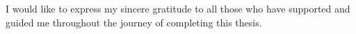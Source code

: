 \newpage
{}

I would like to express my sincere gratitude to all those who have supported and guided me throughout the journey of completing this thesis.
